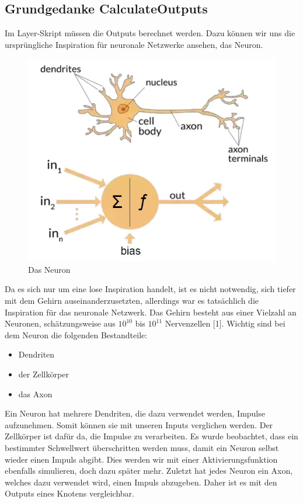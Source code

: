 \documentclass[12pt]{article}
\begin{document}
\subsection{Grundgedanke CalculateOutputs}Im Layer-Skript müssen die Outputs berechnet werden. Dazu können wir uns die ursprüngliche Inspiration für neuronale Netzwerke ansehen, das Neuron.
\begin{figure}[H]
\centering
\includegraphics[scale=0.40]{./Images/Pasted image 20230912175903.png}
\caption{Das Neuron}
\label{Das Neuron}
\end{figure}
Da es sich nur um eine lose Inspiration handelt, ist es nicht notwendig, sich tiefer mit dem Gehirn auseinanderzusetzten, allerdings war es tatsächlich die Inspiration für das neuronale Netzwerk. Das Gehirn besteht aus einer Vielzahl an Neuronen, schätzungsweise aus $10^{10}$ bis $10^{11}$ Nervenzellen [1].
Wichtig sind bei dem Neuron die folgenden Bestandteile:
\begin{itemize}
  \item Dendriten
  \item der Zellkörper
  \item das Axon
\end{itemize}
Ein Neuron hat mehrere Dendriten, die dazu verwendet werden, Impulse aufzunehmen. Somit können sie mit unseren Inputs verglichen werden. Der Zellkörper ist dafür da, die Impulse zu verarbeiten. Es wurde beobachtet, dass ein bestimmter Schwellwert überschritten werden muss, damit ein Neuron selbst wieder einen Impuls abgibt. Dies werden wir mit einer Aktivierungsfunktion ebenfalls simulieren, doch dazu später mehr. Zuletzt hat jedes Neuron ein Axon, welches dazu verwendet wird, einen Impuls abzugeben. Daher ist es mit den Outputs eines Knotens vergleichbar.
\end{document}
